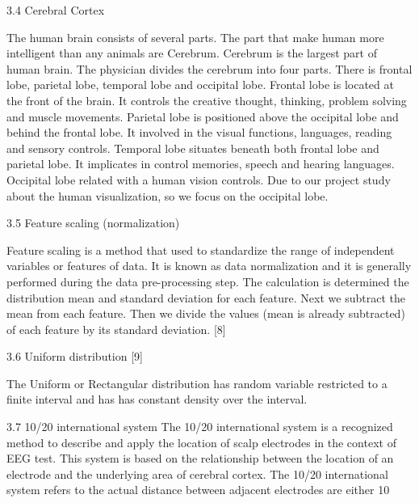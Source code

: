 3.4 Cerebral Cortex

The human brain consists of several parts. The part that make human more intelligent than any animals are Cerebrum. Cerebrum is the largest part of human brain. The physician divides the cerebrum into four parts. There is frontal lobe, parietal lobe, temporal lobe and occipital lobe. Frontal lobe is located at the front of the brain. It controls the creative thought, thinking, problem solving and muscle movements. Parietal lobe is positioned above the occipital lobe and behind the frontal lobe. It involved in the visual functions, languages, reading and sensory controls. Temporal lobe situates beneath both frontal lobe and parietal lobe. It implicates in control memories, speech and hearing languages. Occipital lobe related with a human vision controls. Due to our project study about the human visualization, so we focus on the occipital lobe.

3.5 Feature scaling (normalization)

Feature scaling is a method that used to standardize the range of independent variables or features of data. It is known as data normalization and it is generally performed during the data pre-processing step. The calculation is determined the distribution mean and standard deviation for each feature. Next we subtract the mean from each feature. Then we divide the values (mean is already subtracted) of each feature by its standard deviation. [8]  

3.6 Uniform distribution [9]

The Uniform or Rectangular distribution has random variable  restricted to a finite interval  and has  has constant density over the interval.

3.7 10/20 international system
The 10/20 international system is a recognized method to describe and apply the location of scalp electrodes in the context of EEG test. This system is based on the relationship between the location of an electrode and the underlying area of cerebral cortex. The 10/20 international system refers to the actual distance between adjacent electrodes are either 10%

